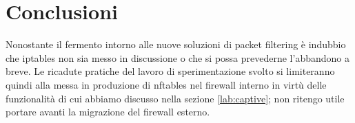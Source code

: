 \section{Conclusioni}

Nonostante il fermento intorno alle nuove soluzioni di packet filtering \`e
indubbio che iptables non sia messo in discussione o che si possa prevederne
l'abbandono a breve.  Le ricadute pratiche del lavoro di sperimentazione
svolto si limiteranno quindi alla messa in produzione di nftables nel firewall
interno in virt\`u delle funzionalit\`a di cui abbiamo discusso nella sezione
\ref{lab:captive}; non ritengo utile portare avanti la migrazione del
firewall esterno.
